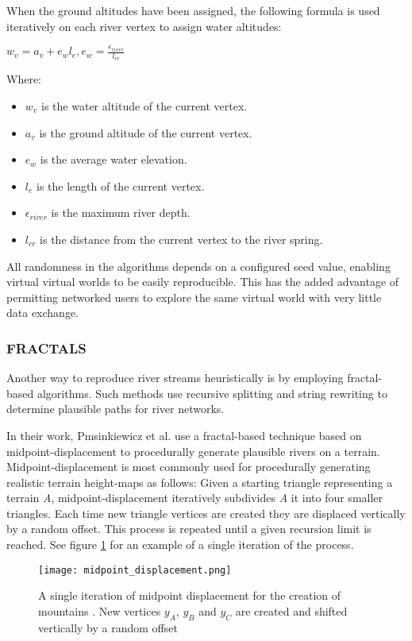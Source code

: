 When the ground altitudes have been assigned, the following formula is used iteratively on each river vertex to assign water altitudes:

$w_{v} = a_{v} + e_{w}l_{e}, e_{w} = \frac{\epsilon_{river}}{l_{cr}} $

Where:
\begin{itemize}
\item $w_{v}$ is the water altitude of the current vertex.
\item $a_{v}$ is the ground altitude of the current vertex.
\item $e_{w}$ is the average water elevation.
\item $l_{e}$ is the length of the current vertex.
\item $\epsilon_{river}$ is the maximum river depth.
\item $l_{cr}$ is the distance from the current vertex to the river spring.
\end{itemize}

All randomness in the algorithms depends on a configured seed value, enabling virtual virtual worlds to be easily reproducible. This has the added advantage of permitting networked users to explore the same virtual world with very little data exchange. \\

\subsubsection{FRACTALS}

Another way to reproduce river streams heuristically is by employing fractal-based algorithms. Such methods use recursive splitting and string rewriting to determine plausible paths for river networks. 

In their work, Pmsinkiewicz et al. use a fractal-based technique based on midpoint-displacement to procedurally generate plausible rivers on a terrain. Midpoint-displacement is most commonly used for procedurally generating realistic terrain height-maps as follows: Given a starting triangle representing a terrain \textit{A}, midpoint-displacement iteratively subdivides \textit{A} it into four smaller triangles. Each time new triangle vertices are created they are displaced vertically by a random offset. This process is repeated until a given recursion limit is reached. See figure \ref{Midpoint displacement} for an example of a single iteration of the process.

\begin{figure}[h]
  \centering
	\label{Midpoint displacement}
	\texttt{[image: midpoint\_displacement.png]}
	\caption{A single iteration of midpoint displacement for the creation of mountains \cite{Prusinkiewicz1993}. New vertices $y_{A}$, $y_{B}$ and $y_{C}$ are created and shifted vertically by a random offset}
\end{figure}

